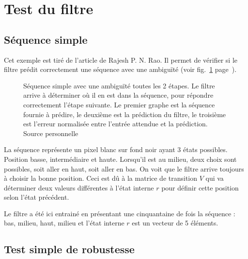 
\section{Test du filtre} %
\label{sec:Test du filtre}

\subsection{Séquence simple} %
\label{sub:Sequence simple}

Cet exemple est tiré de l'article de Rajesh P. N. Rao. Il permet de vérifier si
le filtre prédit correctement une séquence avec une ambiguïté (voir
fig.~\ref{fig:sequence_simple} page~\pageref{fig:sequence_simple}).

\begin{figure}[ht]
   \begin{center}
   \end{center}
   \caption[Prédiction de séquence simple]{Séquence simple avec une ambiguïté
   toutes les 2 étapes. Le filtre arrive à déterminer où il en est dans la
   séquence, pour répondre correctement l'étape suivante. Le premier graphe est
   la séquence fournie à prédire, le deuxième est la prédiction du filtre, le
   troisième est l'erreur normalisée entre l'entrée attendue et la prédiction.
   Source personnelle}
   \label{fig:sequence_simple}
\end{figure}

La séquence représente un pixel blanc sur fond noir ayant 3 états possibles.
Position basse, intermédiaire et haute. Lorsqu'il est au milieu, deux choix sont
possibles, soit aller en haut, soit aller en bas. On voit que le filtre arrive
toujours à choisir la bonne position. Ceci est dû à la matrice de transition
$V$ qui va déterminer deux valeurs différentes à l'état interne $r$ pour définir
cette position selon l'état précédent\cite{Rao1999}.

Le filtre a été ici entrainé en présentant une cinquantaine de fois la séquence :
bas, milieu, haut, milieu et l'état interne $r$ est un vecteur de 5 éléments.


\subsection{Test simple de robustesse} %
\label{sub:Test simple de robustesse}

